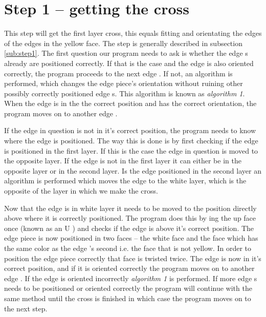 \section{Step 1 -- getting the cross}
This step will get the first layer cross, this equals fitting and orientating the edges of the edges in the yellow face. 
The step is generally described in subsection \ref{sub:step1}.
The first question our program needs to ask is whether the edge \cpiece{}s already are positioned correctly. If that is the case and the edge \cpiece{} is also oriented correctly, the program proceeds to the next edge \cpiece{}. If not, an algorithm is performed, which changes the edge piece's orientation without ruining other possibly correctly positioned edge \cpiece{}s. 
This algorithm is known as \textit{algorithm 1}. When the edge \cpiece{} is in the the correct position and has the correct orientation, the program moves on to another edge \cpiece{}. 

If the edge \cpiece{} in question is not in it's correct position, the program needs to know where the edge is positioned. 
The way this is done is by first checking if the edge \cpiece{} is positioned in the first layer. 
If this is the case the edge \cpiece{} in question is moved to the opposite layer. 
If the edge \cpiece{} is not in the first layer it can either be in the opposite layer or in the second layer.
Is the edge \cpiece{}  positioned in the second layer an algorithm is performed which moves the edge \cpiece{}  to the white layer, which is the opposite of the layer in which we make the cross.

Now that the edge \cpiece{}  is in white layer it needs to be moved to the position directly above where it is correctly positioned. 
The program does this by \twist{}ing the up face once (known as an U \twist{}) and checks if the edge \cpiece{} is above it's correct position.
The edge piece is now positioned in two faces -- the white face and the face which has the same color as the edge  \cpiece{}'s second \facelet{} i.e. the face that is not yellow.
In order to position the edge piece correctly that face is twisted twice.
The edge \cpiece{}  is now in it's correct position, and if it is oriented correctly the program moves on to another edge  \cpiece{} .
If the edge \cpiece{} is oriented incorrectly \textit{algorithm 1} is performed. If more edge  \cpiece{}s needs to be positioned or oriented correctly the program will continue with the same method until the cross is finished in which case the program moves on to the next step.

